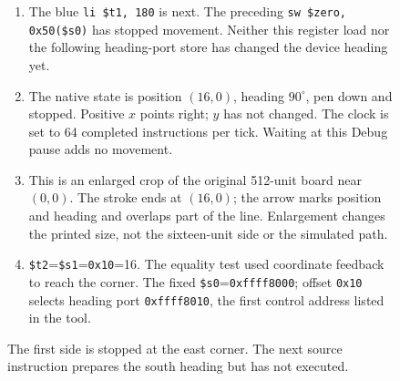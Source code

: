 \begin{figure}[htbp]
  \par\smallskip
  \begin{minipage}{\linewidth}
    \small
    \begin{enumerate}
      \item The blue \texttt{li \$t1, 180} is next. The preceding \texttt{sw \$zero, 0x50(\$s0)} has stopped movement. Neither this register load nor the following heading-port store has changed the device heading yet.
      \item The native state is position $(16,0)$, heading $90^\circ$, pen down and stopped. Positive $x$ points right; $y$ has not changed. The clock is set to 64 completed instructions per tick. Waiting at this Debug pause adds no movement.
      \item This is an enlarged crop of the original 512-unit board near $(0,0)$. The stroke ends at $(16,0)$; the arrow marks position and heading and overlaps part of the line. Enlargement changes the printed size, not the sixteen-unit side or the simulated path.
      \item \texttt{\$t2}=\texttt{\$s1}=\texttt{0x10}=16. The equality test used coordinate feedback to reach the corner. The fixed \texttt{\$s0}=\texttt{0xffff8000}; offset \texttt{0x10} selects heading port \texttt{0xffff8010}, the first control address listed in the tool.
    \end{enumerate}
  \end{minipage}
  \caption{The first side is stopped at the east corner. The next source instruction prepares the south heading but has not executed.}
  \label{capture:006-marsbot-square-f01-east}
\end{figure}
\par
